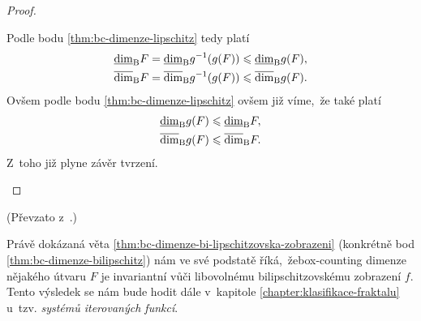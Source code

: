 \begin{proof}
\begin{enumerate}[label=\textit{(\roman*)}]
        Podle bodu \ref{thm:bc-dimenze-lipschitz} tedy platí
        \begin{align*}
            \underline{\dim}_\textup{B}{F}&=\underline{\dim}_\textup{B}{g^{-1}(g(F))}\leqslant\underline{\dim}_\textup{B}{g(F)},\\
            \overline{\dim}_\textup{B}{F}&=\overline{\dim}_\textup{B}{g^{-1}(g(F))}\leqslant\overline{\dim}_\textup{B}{g(F)}.
        \end{align*}
        Ovšem podle bodu \ref{thm:bc-dimenze-lipschitz} ovšem již víme,~že také platí
        \begin{align*}
            \underline{\dim}_\textup{B}{g(F)}&\leqslant\underline{\dim}_\textup{B}{F},\\
            \overline{\dim}_\textup{B}{g(F)}&\leqslant\overline{\dim}_\textup{B}{F}.
        \end{align*}
        Z~toho již plyne závěr tvrzení.
    \end{enumerate}
\end{proof}
(Převzato z~\citep[str. 36]{Falconer2014}.)

Právě dokázaná věta \ref{thm:bc-dimenze-bi-lipschitzovska-zobrazeni} (konkrétně bod \ref{thm:bc-dimenze-bilipschitz}) nám ve své podstatě říká,~že\linebreak{}box-counting dimenze nějakého útvaru $F$ je invariantní vůči libovolnému bilipschitzovskému zobrazení $f$. Tento výsledek se nám bude hodit dále v~kapitole \ref{chapter:klasifikace-fraktalu} u~tzv. \emph{systémů iterovaných funkcí}. 